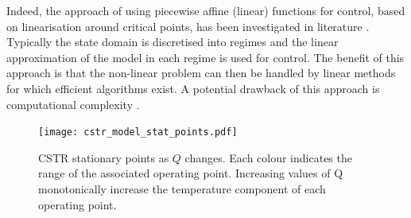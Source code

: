 \documentclass[../masters.tex]{subfiles}
\begin{document}
Indeed, the approach of using piecewise affine (linear) functions for control, based on linearisation around critical points, has been investigated in literature \cite{du}\cite{kvasnica}. Typically the state domain is discretised into regimes and the linear approximation of the model in each regime is used for control. The benefit of this approach is that the non-linear problem  can then be handled by linear methods for which efficient algorithms exist. A potential drawback of this approach is computational complexity \cite{du}.
\begin{figure}[H] 
\centering
\texttt{[image: cstr\_model\_stat\_points.pdf]}
\caption{CSTR stationary points as $Q$ changes. Each colour indicates the range of the associated operating point. Increasing values of Q monotonically increase the temperature component of each operating point.}
\label{fig_cstr_stat_points}
\end{figure}
\end{document}
